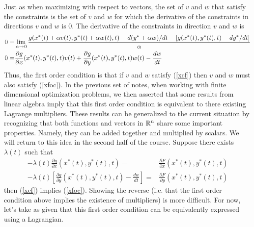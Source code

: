 Just as when maximizing with respect to vectors, the set of $v$ and
$w$ that satisfy the constraints is the set of $v$ and $w$ for which the
derivative of the constraints in directions $v$ and $w$ is 0. The
derivative of the constraints in direction $v$ and $w$ is
\begin{align} 
  0 = & \lim_{\alpha \to 0} \frac{g(x^*(t) + \alpha v(t), y^*(t) +
        \alpha w(t),t) -
        d(y^*+\alpha w)/dt - [g(x^*(t), y^*(t),t) - dy^*/dt]}{\alpha} \notag \\
  0 = & \frac{\partial g}{\partial x}(x^*(t),y^*(t),t)v(t) +
        \frac{\partial g}{\partial y}(x^*(t),y^*(t),t)w(t) - \frac{dw}{dt}\label{xcf}
\end{align}
Thus, the first order condition is that if $v$ and $w$ satisfy
(\ref{xcf}) then $v$ and $w$ must also satisfy (\ref{xfoc}). In the
previous set of notes, when working with finite dimensional
optimization problems, we then asserted that some results from linear
algebra imply that this first order condition is equivalent to there
existing Lagrange multipliers. These results can be generalized to the
current situation by recognizing that both functions and vectors in
$\R^n$ share some important properties. Namely, they can be added
together and multiplied by scalars. We will return to this idea in the
second half of the course. Suppose there exists $\lambda(t)$ such that
\begin{align*}
  -\lambda(t)  \frac{\partial g}{\partial x}(x^*(t),y^*(t),t) = &
  \frac{\partial F}{\partial x}(x^*(t),y^*(t),t) \\
  -\lambda(t)  \left[ \frac{\partial g}{\partial y}(x^*(t),y^*(t),t)
  - \frac{dw}{dt} \right]= &
                             \frac{\partial F}{\partial
                             y}(x^*(t),y^*(t),t) 
\end{align*}
then (\ref{xcf}) implies (\ref{xfoc}). Showing the reverse (i.e. that
the first order condition above implies the existence of multipliers)
is more difficult. For now, let's take as given that this first order
condition can be equivalently expressed using a Lagrangian.

